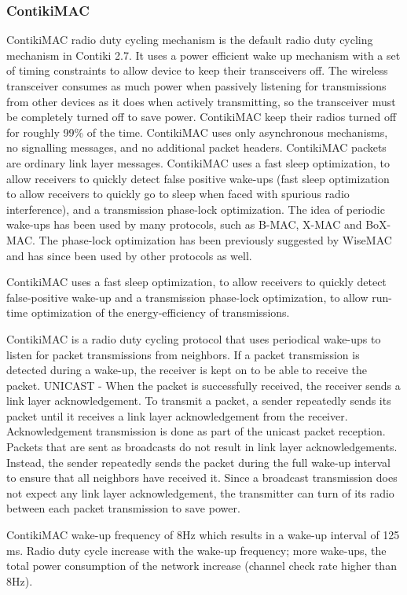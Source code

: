 \subsubsection{ContikiMAC}
ContikiMAC radio duty cycling mechanism is the default radio duty cycling mechanism in Contiki 2.7. It uses a power efficient wake up mechanism with a set of timing constraints to allow device to keep their transceivers off. The wireless transceiver consumes as much power when passively listening for transmissions from other devices as it does when actively transmitting, so the transceiver must be completely turned off to save power. ContikiMAC keep their radios turned off for roughly 99\% of the time.  ContikiMAC uses only asynchronous mechanisms, no signalling messages, and no additional packet headers. ContikiMAC packets are ordinary link layer messages. ContikiMAC uses a fast sleep optimization, to allow receivers to quickly detect false positive wake-ups (fast sleep optimization to allow receivers to quickly go to sleep when faced with spurious radio interference), and a transmission phase-lock optimization. The idea of periodic wake-ups has been used by many protocols, such as B-MAC, X-MAC and BoX-MAC. The phase-lock optimization has been previously suggested by WiseMAC and has since been used by other protocols as well. 

ContikiMAC uses a fast sleep optimization, to allow receivers to quickly detect false-positive wake-up and a transmission phase-lock optimization, to allow run-time optimization of the energy-efficiency of transmissions. 

ContikiMAC is a radio duty cycling protocol that uses periodical wake-ups to listen for packet transmissions from neighbors. If a packet transmission is detected during a wake-up, the receiver is kept on to be able to receive the packet. UNICAST - When the packet is successfully received, the receiver sends a link layer acknowledgement. To transmit a packet, a sender repeatedly sends its packet until it receives a link layer acknowledgement from the receiver. Acknowledgement transmission is done as part of the unicast packet reception. Packets that are sent as broadcasts do not result in link layer acknowledgements. Instead, the sender repeatedly sends the packet during the full wake-up interval to ensure that all neighbors have received it. Since a broadcast transmission does not expect any link layer acknowledgement, the transmitter can turn of its radio between each packet transmission to save power.

ContikiMAC wake-up frequency of 8Hz which results in a wake-up interval of 125 ms. Radio duty cycle increase with the wake-up frequency; more wake-ups, the total power consumption of the network increase (channel check rate higher than 8Hz).

